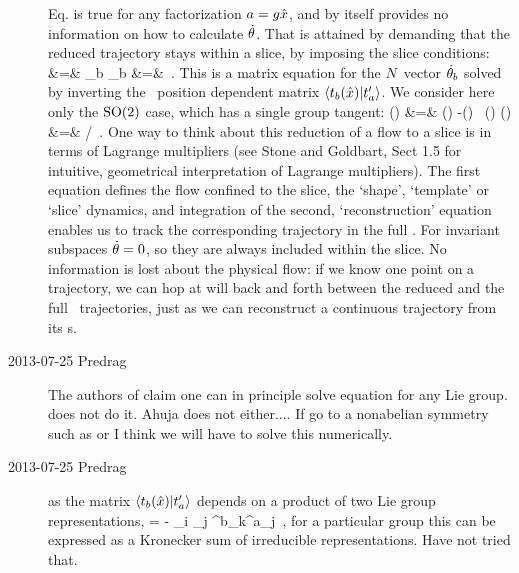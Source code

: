 \begin{description}
Eq.  is true for any factorization
$a=g \hat{x}$, and by itself provides no
information on how to calculate $\dot{\theta}$. That is attained by
demanding that the reduced trajectory stays within a slice, by imposing
the slice conditions: %
\bea
 &=& 
    \continue
\sum_b \dot{\gSpace}_b 
 &=&
\,.
\label{eq:slicecondition}
\eea
This is a matrix equation for the $N$\dmn\ vector $\dot{\theta}_b$ solved
by inverting the \statesp\ position dependent matrix
$\braket{\groupTan_b(\sspRed)}{\sliceTan{a}}$.
We consider here only the
$\textrm{SO}(2)$ case, which has a single group tangent:
\bea
\velRed(\sspRed) &=& \vel(\sspRed)
   -\dot{\gSpace}(\sspRed) \, \groupTan(\sspRed)
\continue
\dot{\gSpace}(\sspRed) &=& {\braket{\vel(\sspRed)}{\sliceTan{}}}/
               {\braket{\groupTan(\sspRed)}{\sliceTan{}}}
\,.
\label{eq:so2reduced}
\eea
One way to think about this reduction of a flow to a slice is in terms of
Lagrange multipliers (see {Stone and Goldbart}, Sect 1.5 for
intuitive, geometrical interpretation of Lagrange multipliers). The first
equation defines the flow confined to the slice,
the `shape', `template' or `slice' dynamics,
and integration of the second,
`reconstruction' equation enables us to track the
corresponding trajectory in the full \statesp. For invariant subspaces
$\dot{\theta}=0$, so they are always included within the slice. No
information is lost about the physical flow: if we know one point on a
trajectory, we can hop at will back and forth between the reduced
and the full \statesp\ trajectories, just as we can reconstruct a
continuous trajectory from its \PoincSec s.

\item[2013-07-25  Predrag]
The authors of  claim one
can in principle solve equation  for any Lie group.
 does not do it. Ahuja does not either.... If go to a
nonabelian symmetry such as  or  I think we will have to
solve this numerically.

\item[2013-07-25  Predrag] as the matrix
$\braket{\groupTan_b(\sspRed)}{\sliceTan{a}}$ depends on a product of
two Lie group representations,
\beq
{}
 =
 - \sspRed_i \slicep_j \Lg^b_{k\ell}\Lg^a_{\ell j}
\,,
\label{eq:so2reduced}
\eeq
for a particular group this can be expressed as a Kronecker sum of
irreducible representations. Have not tried that.


\end{description}
